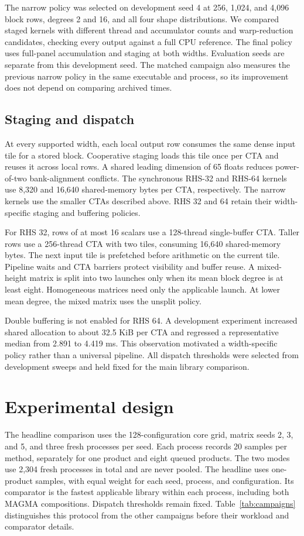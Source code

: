 \documentclass[10pt]{article}
\begin{document}
The narrow policy was selected on development seed 4 at 256, 1,024, and
4,096 block rows, degrees 2 and 16, and all four shape distributions. We
compared staged kernels with different thread and accumulator counts and
warp-reduction candidates, checking every output against a full CPU reference.
The final policy uses full-panel accumulation and staging at both widths.
Evaluation seeds are separate from this development seed. The matched
campaign also measures the previous narrow policy in the same executable
and process, so its improvement does not depend on comparing archived times.

\subsection{Staging and dispatch}
At every supported width, each local output row consumes the same dense input tile
for a stored block. Cooperative staging loads this tile once per CTA and
reuses it across local rows. A shared leading dimension of 65 floats reduces
power-of-two bank-alignment conflicts. The synchronous RHS-32 and RHS-64
kernels use 8,320 and 16,640 shared-memory bytes per CTA, respectively.
The narrow kernels use the smaller CTAs described above. RHS 32 and 64
retain their width-specific staging and buffering policies.

For RHS 32, rows of at most 16 scalars use a 128-thread single-buffer CTA.
Taller rows use a 256-thread CTA with two tiles, consuming 16,640 shared-memory
bytes. The next input tile is prefetched before arithmetic on the current
tile. Pipeline waits and CTA barriers protect visibility and buffer reuse.
A mixed-height matrix is split into two launches only when its mean block
degree is at least eight. Homogeneous matrices need only the applicable
launch. At lower mean degree, the mixed matrix uses the unsplit policy.

Double buffering is not enabled for RHS 64. A development experiment increased
shared allocation to about 32.5 KiB per CTA and regressed a representative
median from 2.891 to 4.419 ms. This observation motivated a width-specific
policy rather than a universal pipeline. All dispatch thresholds were selected
from development sweeps and held fixed for the main library comparison.

\section{Experimental design}
The headline comparison uses the 128-configuration core grid, matrix seeds
2, 3, and 5, and three fresh processes per seed. Each process records 20
samples per method, separately for one product and eight queued products.
The two modes use 2,304 fresh processes in total and are never pooled.
The headline uses one-product samples, with equal weight for each seed,
process, and configuration. Its comparator is the fastest applicable library
within each process, including both MAGMA compositions. Dispatch thresholds
remain fixed. Table~\ref{tab:campaigns} distinguishes this protocol from the
other campaigns before their workload and comparator details.
\end{document}
